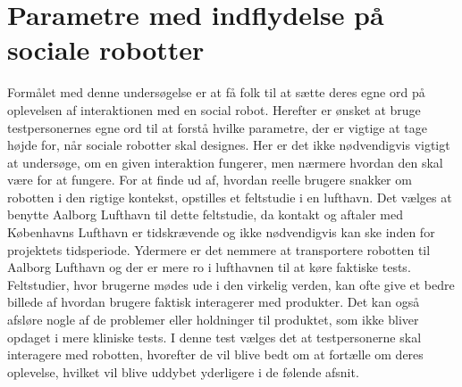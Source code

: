 	\chapter{Parametre med indflydelse på sociale robotter}
\label{ParametreSocialeRobotter}
%
Formålet med denne undersøgelse er at få folk til at sætte deres egne ord på oplevelsen af interaktionen med en social robot. Herefter er ønsket at bruge testpersonernes egne ord til at forstå hvilke parametre, der er vigtige at tage højde for, når sociale robotter skal designes. Her er det ikke nødvendigvis vigtigt at undersøge, om en given interaktion fungerer, men nærmere hvordan den skal være for at fungere. For at finde ud af, hvordan reelle brugere snakker om robotten i den rigtige kontekst, opstilles et feltstudie i en lufthavn. Det vælges at benytte Aalborg Lufthavn til dette feltstudie, da kontakt og aftaler med Københavns Lufthavn er tidskrævende og ikke nødvendigvis kan ske inden for projektets tidsperiode. Ydermere er det nemmere at transportere robotten til Aalborg Lufthavn og der er mere ro i lufthavnen til at køre faktiske tests.\blankline
%
Feltstudier, hvor brugerne mødes ude i den virkelig verden, kan ofte give et bedre billede af hvordan brugere faktisk interagerer med produkter. Det kan også afsløre nogle af de problemer eller holdninger til produktet, som ikke bliver opdaget i mere kliniske tests. I denne test vælges det at testpersonerne skal interagere med robotten, hvorefter de vil blive bedt om at fortælle om deres oplevelse, hvilket vil blive uddybet yderligere i de følende afsnit.
